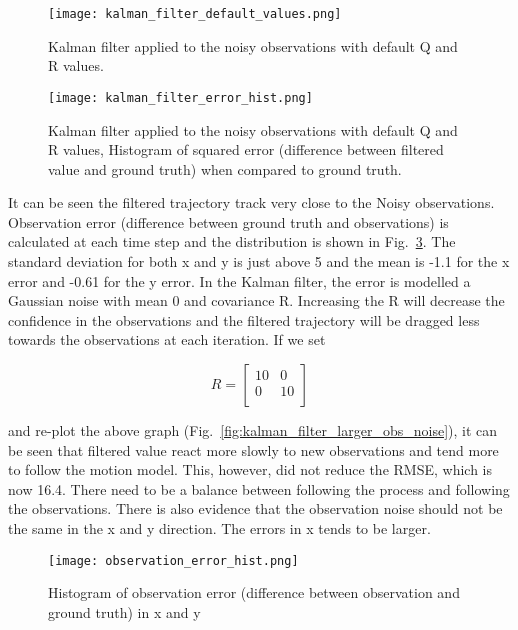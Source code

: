 \documentclass{report}
\begin{document}
\begin{figure}[ht]
    \centering
    \texttt{[image: kalman\_filter\_default\_values.png]}
    \caption{Kalman filter applied to the noisy observations with default Q and R values.}
    \label{fig:kalman_filter_default_values}
\end{figure}

\begin{figure}[ht]
    \centering
    \texttt{[image: kalman\_filter\_error\_hist.png]}
    \caption{Kalman filter applied to the noisy observations with default Q and R values, Histogram of squared error (difference between filtered value and ground truth) when compared to ground truth.}
    \label{fig:kalman_filter_error_hist}
\end{figure}


It can be seen the filtered trajectory track very close to the Noisy observations. 
Observation error (difference between ground truth and observations) is calculated at each time step and the distribution is shown in Fig.~\ref{fig:observation_error_hist}. The standard deviation for both x and y is just above 5 and the mean is -1.1 for the x error and -0.61 for the y error. In the Kalman filter, the error is modelled a Gaussian noise with mean 0 and covariance R. Increasing the R will decrease the confidence in the observations and the filtered trajectory will be dragged less towards the observations at each iteration. If we set

\[R = \begin{bmatrix} 
    10 & 0 \\
    0 & 10 \\
\end{bmatrix}\]

and re-plot the above graph (Fig.~\ref{fig:kalman_filter_larger_obs_noise}), it can be seen that filtered value react more slowly to new observations and tend more to follow the motion model. This, however, did not reduce the RMSE, which is now 16.4. There need to be a balance between following the process and following the observations. There is also evidence that the observation noise should not be the same in the x and y direction. The errors in x tends to be larger.


\begin{figure}[ht]
    \centering
    \texttt{[image: observation\_error\_hist.png]}
    \caption{Histogram of observation error (difference between observation and ground truth) in x and y}
    \label{fig:observation_error_hist}
\end{figure}
\end{document}
